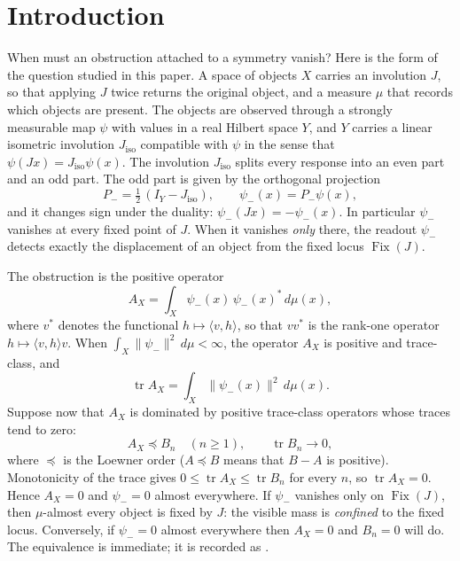 \documentclass[11pt]{article}
\DeclareMathOperator{\Fix}{Fix}
\DeclareMathOperator{\trace}{tr}
\newcommand{\Pminus}{P_{-}}
\newcommand{\psim}{\psi_{-}}
\newcommand{\AX}{A_{X}}
\newcommand{\Jiso}{J_{\mathrm{iso}}}
\theoremstyle{definition}
\begin{document}
\section{Introduction}
\label{sec:intro}

When must an obstruction attached to a symmetry vanish?  Here is the
form of the question studied in this paper.  A space of objects \(X\)
carries an involution \(J\), so that applying \(J\) twice returns the
original object, and a measure \(\mu\) that records which objects are
present.  The objects are observed through a strongly measurable map
\(\psi\) with values in a real Hilbert space \(Y\), and \(Y\) carries a
linear isometric involution \(\Jiso\) compatible with \(\psi\) in the
sense that \(\psi(Jx)=\Jiso\psi(x)\).  The involution \(\Jiso\) splits every
response into an even part and an odd part.  The odd part is given by
the orthogonal projection
\[
  \Pminus=\tfrac12\,(I_Y-\Jiso),
  \qquad
  \psim(x)=\Pminus\psi(x),
\]
and it changes sign under the duality: \(\psim(Jx)=-\psim(x)\).  In
particular \(\psim\) vanishes at every fixed point of \(J\).  When it
vanishes \emph{only} there, the readout \(\psim\) detects exactly
the displacement of an object from the fixed locus \(\Fix(J)\).

The obstruction is the positive operator
\[
  \AX=\int_X \psim(x)\,\psim(x)^*\,d\mu(x),
\]
where \(v^*\) denotes the functional \(h\mapsto\langle v,h\rangle\),
so that \(vv^*\) is the rank-one operator
\(h\mapsto\langle v,h\rangle v\).  When
\(\int_X\|\psim\|^2\,d\mu<\infty\), the operator \(\AX\) is positive
and trace-class, and
\[
  \trace\AX=\int_X\|\psim(x)\|^2\,d\mu(x).
\]
Suppose now that \(\AX\) is dominated by positive trace-class
operators whose traces tend to zero:
\[
  \AX\preceq B_n\quad(n\geq1),
  \qquad
  \trace B_n\to0,
\]
where \(\preceq\) is the Loewner order (\(A\preceq B\) means that
\(B-A\) is positive).  Monotonicity of the trace gives
\(0\leq\trace\AX\leq\trace B_n\) for every \(n\), so
\(\trace\AX=0\).  Hence \(\AX=0\) and \(\psim=0\) almost everywhere.
If \(\psim\) vanishes only on \(\Fix(J)\), then \(\mu\)-almost every
object is fixed by \(J\): the visible mass is \emph{confined} to the
fixed locus.  Conversely, if \(\psim=0\) almost everywhere then
\(\AX=0\) and \(B_n=0\) will do.  The equivalence is immediate; it is
recorded as .
\end{document}
